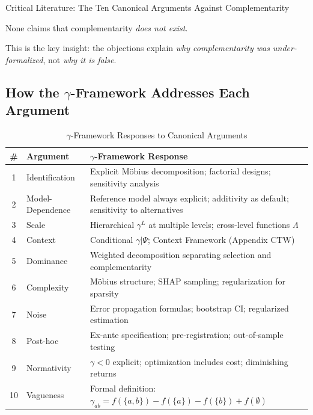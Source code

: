 \begin{chapter}{Critical Literature: The Ten Canonical Arguments Against Complementarity}
\begin{tcolorbox}[colback=green!5!white,colframe=green!75!black,title=\textbf{Central Finding}]
None claims that complementarity \textit{does not exist}.
\end{tcolorbox}

This is the key insight: the objections explain \textit{why complementarity was under-formalized}, not \textit{why it is false}.

\subsection{How the $\gamma$-Framework Addresses Each Argument}

\begin{table}[h]
\centering
\caption{$\gamma$-Framework Responses to Canonical Arguments}
\label{tab:gamma-responses}
\renewcommand{\arraystretch}{1.4}
\small
\begin{tabular}{@{}clp{6cm}@{}}
\toprule
\textbf{\#} & \textbf{Argument} & \textbf{$\gamma$-Framework Response} \\
\midrule
1 & Identification & Explicit Möbius decomposition; factorial designs; sensitivity analysis \\
2 & Model-Dependence & Reference model always explicit; additivity as default; sensitivity to alternatives \\
3 & Scale & Hierarchical $\gamma^L$ at multiple levels; cross-level functions $\Lambda$ \\
4 & Context & Conditional $\gamma|\Psi$; Context Framework (Appendix CTW) \\
5 & Dominance & Weighted decomposition separating selection and complementarity \\
6 & Complexity & Möbius structure; SHAP sampling; regularization for sparsity \\
7 & Noise & Error propagation formulas; bootstrap CI; regularized estimation \\
8 & Post-hoc & Ex-ante specification; pre-registration; out-of-sample testing \\
9 & Normativity & $\gamma < 0$ explicit; optimization includes cost; diminishing returns \\
10 & Vagueness & Formal definition: $\gamma_{ab} = f(\{a,b\}) - f(\{a\}) - f(\{b\}) + f(\emptyset)$ \\
\bottomrule
\end{tabular}
\end{table}



\end{chapter}
